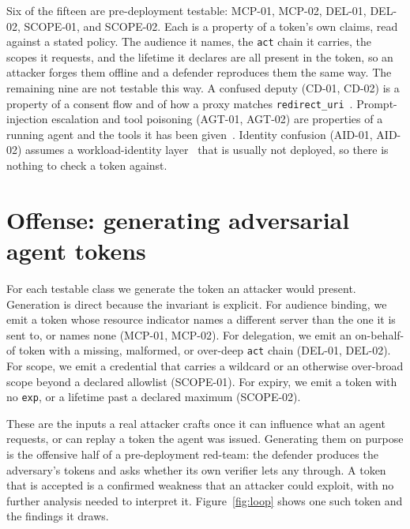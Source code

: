 Six of the fifteen are pre-deployment testable: MCP-01, MCP-02, DEL-01, DEL-02,
SCOPE-01, and SCOPE-02. Each is a property of a token's own claims, read against a
stated policy. The audience it names, the \texttt{act} chain it carries, the scopes
it requests, and the lifetime it declares are all present in the token, so an attacker
forges them offline and a defender reproduces them the same way. The remaining nine
are not testable this way. A confused deputy (CD-01, CD-02) is a property of a consent
flow and of how a proxy matches \texttt{redirect\_uri}~\cite{mcpauth,rfc7591}.
Prompt-injection escalation and tool poisoning (AGT-01, AGT-02) are properties of a
running agent and the tools it has been given~\cite{owaspllm,owaspagentic}. Identity
confusion (AID-01, AID-02) assumes a workload-identity layer~\cite{wimse,spiffe} that
is usually not deployed, so there is nothing to check a token against.

\section{Offense: generating adversarial agent tokens}\label{sec:offense}
For each testable class we generate the token an attacker would present. Generation is
direct because the invariant is explicit. For audience binding, we emit a token whose
resource indicator names a different server than the one it is sent to, or names none
(MCP-01, MCP-02). For delegation, we emit an on-behalf-of token with a missing,
malformed, or over-deep \texttt{act} chain (DEL-01, DEL-02). For scope, we emit a
credential that carries a wildcard or an otherwise over-broad scope beyond a declared
allowlist (SCOPE-01). For expiry, we emit a token with no \texttt{exp}, or a lifetime
past a declared maximum (SCOPE-02).

These are the inputs a real attacker crafts once it can influence what an agent
requests, or can replay a token the agent was issued. Generating them on purpose is
the offensive half of a pre-deployment red-team: the defender produces the
adversary's tokens and asks whether its own verifier lets any through. A token that is
accepted is a confirmed weakness that an attacker could exploit, with no further
analysis needed to interpret it. Figure~\ref{fig:loop} shows one such token and the
findings it draws.

